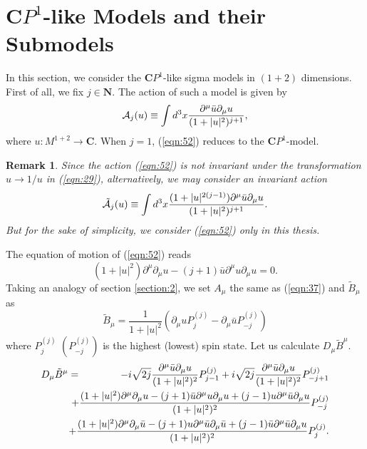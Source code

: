 \documentclass[makeidx,12pt,openany]{report}
\newtheorem{rmk}[df]{Remark}
\begin{document}
 \section{$\mathbf{C}P^1$-like Models and their Submodels}
In this section, we consider the $\mathbf{C}P^1$-like sigma models in $(1+2)$ 
dimensions.  First of all, 
we fix $j \in \mathbf{N}$. The action of such a model is given by
\begin{equation}
 \mbox{$\cal{A}$}_j(u) \equiv \int d^3 x \frac{\partial^{\mu}\bar{u}\partial_{\mu}u}
                               {(1+|u|^2)^{j+1}},
 \label{eqn:52}
\end{equation}
where $u: M^{1+2} \rightarrow \mathbf{C}$. 
When $j=1$, (\ref{eqn:52}) reduces to the $\mathbf{C}P^1$-model. 
\begin{rmk}
Since the action (\ref{eqn:52}) is not invariant under the transformation 
$u \rightarrow 1/u$ in (\ref{eqn:29}), alternatively, we may consider an 
invariant action
\begin{equation}
 \mbox{$\cal{\tilde{A}}$}_j(u) \equiv \int d^3 x 
     \frac{(1+|u|^{2(j-1)})\partial^{\mu}\bar{u}\partial_{\mu}u}
                               {(1+|u|^2)^{j+1}}.
\end{equation}
But for the sake of simplicity, we consider (\ref{eqn:52}) only in 
this thesis. 
\end{rmk}
The equation of motion of (\ref{eqn:52}) reads 
\begin{equation}
 (1+|u|^2)\partial^{\mu}\partial_{\mu}u
        -(j+1)\bar{u}\partial^{\mu}u\partial_{\mu}u =0. 
\end{equation}
Taking an analogy of section \ref{section:2}, we set $A_{\mu}$ the same as (\ref{eqn:37}) and $\tilde{B}_{\mu}$ as
\begin{equation}
 \tilde{B}_{\mu} = \frac{1}{1+|u|^2}
             (\partial_{\mu}u P_j^{(j)}-\partial_{\mu}\bar{u} P_{-j}^{(j)})
\label{eqn:Bmu-j-j}
\end{equation}
where $P_j^{(j)}$ $(P_{-j}^{(j)})$ is the highest (lowest) spin state. Let us calculate $D_{\mu}\tilde{B}^{\mu}$. 
\begin{eqnarray}
 D_{\mu}\tilde{B}^{\mu} &=& 
    -i\sqrt{2j}
      \frac{\partial^{\mu}\bar{u}\partial_{\mu}u}{(1+|u|^2)^2}P_{j-1}^{(j)}
    +i\sqrt{2j}
      \frac{\partial^{\mu}\bar{u}\partial_{\mu}u}{(1+|u|^2)^2}P_{-j+1}^{(j)}
       \nonumber\\
 && \hspace*{-7mm}
    +\frac{(1+|u|^2)\partial^{\mu}\partial_{\mu}u
        -(j+1)\bar{u}\partial^{\mu}u\partial_{\mu}u
        +(j-1)u\partial^{\mu}\bar{u}\partial_{\mu}u}
          {(1+|u|^2)^2}P_{-j}^{(j)} \nonumber\\
 && \hspace*{-7mm}
    +\frac{(1+|u|^2)\partial^{\mu}\partial_{\mu}\bar{u}
        -(j+1)u\partial^{\mu}\bar{u}\partial_{\mu}\bar{u}
        +(j-1)\bar{u}\partial^{\mu}\bar{u}\partial_{\mu}u}
          {(1+|u|^2)^2}P_j^{(j)} .
\end{eqnarray}
\end{document}
